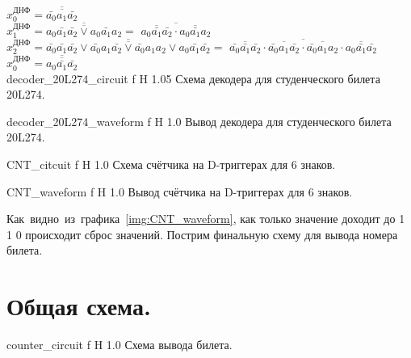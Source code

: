 \documentclass{bmstu}
\begin{document}
	$x_0^{\text{ДНФ}} = \overline{\overline{\bar{a_0} a_1 \bar{a_2}}}$ \\
	$x_1^{\text{ДНФ}} = \overline{\overline{a_0 \bar{a_1} \bar{a_2} \vee a_0 \bar{a_1} a_2}} =$ $\overline{\overline{a_0 \bar{a_1} \bar{a_2}} \cdot \overline{a_0 \bar{a_1} a_2}}$ \\
	$x_2^{\text{ДНФ}} = \overline{\overline{\bar{a_0} \bar{a_1} \bar{a_2} \vee \bar{a_0} a_1 \bar{a_2} \vee \bar{a_0} a_1 a_2 \vee a_0 \bar{a_1} \bar{a_2}}} =$
	$\overline{\overline{\bar{a_0} \bar{a_1} \bar{a_2}} \cdot \overline{\bar{a_0} a_1 \bar{a_2}} \cdot \overline{\bar{a_0} a_1 a_2} \cdot \overline{a_0 \bar{a_1} \bar{a_2}}}$ \\
	$x_0^{\text{ДНФ}} = \overline{\overline{a_0 \bar{a_1} \bar{a_2}}}$ \\
	
	{decoder_20L274_circuit}
	{f} %
	{H} %
	{1.05\textwidth} %
	{Схема декодера для студенческого билета 20L274.} %
	
	{decoder_20L274_waveform}
	{f} %
	{H} %
	{1.0\textwidth} %
	{Вывод декодера для студенческого билета 20L274.} %
	
	{CNT_citcuit}
	{f} %
	{H} %
	{1.0\textwidth} %
	{Схема счётчика на D-триггерах для 6 знаков.} %
	
	{CNT_waveform}
	{f} %
	{H} %
	{1.0\textwidth} %
	{Вывод счётчика на D-триггерах для 6 знаков.} %
	
	\begin{flushleft}
		Как~видно~из~графика~\ref{img:CNT_waveform}, как только значение доходит
		до 1 1 0 происходит сброс значений. Пострим финальную схему для вывода
		номера билета.
	\end{flushleft}
	
	\section{Общая схема.}
	{counter_circuit}
	{f} %
	{H} %
	{1.0\textwidth} %
	{Схема вывода билета.} %
	
\end{document}
